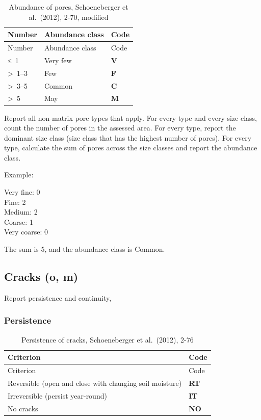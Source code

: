 \documentclass[
  letterpaper,
  DIV=11,
  numbers=noendperiod]{scrreprt}
\begin{document}
\begin{longtable}[]{@{}lll@{}}
\caption{Abundance of pores, Schoeneberger et al.~(2012), 2-70,
modified}\tabularnewline
\toprule()
Number & Abundance class & Code \\
\midrule()
\endfirsthead
\toprule()
Number & Abundance class & Code \\
\midrule()
\endhead
≤~1 & Very few & \textbf{V} \\
\textgreater~1--3 & Few & \textbf{F} \\
\textgreater~3--5 & Common & \textbf{C} \\
\textgreater~5 & May & \textbf{M} \\
\bottomrule()
\end{longtable}

Report all non-matrix pore types that apply. For every type and every
size class, count the number of pores in the assessed area. For every
type, report the dominant size class (size class that has the highest
number of pores). For every type, calculate the sum of pores across the
size classes and report the abundance class.

Example:

Very fine: 0\\
Fine: 2\\
Medium: 2\\
Coarse: 1\\
Very coarse: 0

The sum is 5, and the abundance class is Common.

\hypertarget{cracks-o-m}{%
\subsection{Cracks (o, m)}\label{cracks-o-m}}

Report persistence and continuity,

\hypertarget{persistence}{%
\subsubsection{Persistence}\label{persistence}}

\begin{longtable}[]{@{}ll@{}}
\caption{Persistence of cracks, Schoeneberger et al.~(2012),
2-76}\tabularnewline
\toprule()
Criterion & Code \\
\midrule()
\endfirsthead
\toprule()
Criterion & Code \\
\midrule()
\endhead
Reversible (open and close with changing soil moisture) & \textbf{RT} \\
Irreversible (persist year-round) & \textbf{IT} \\
No cracks & \textbf{NO} \\
\bottomrule()
\end{longtable}
\end{document}
